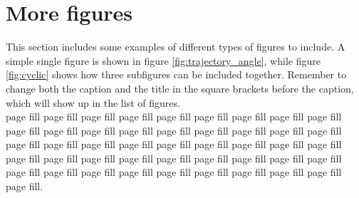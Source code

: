 
\section{More figures}

This section includes some examples of different types of figures to include. A simple single figure is shown in figure \ref{fig:trajectory_angle}, while figure \ref{fig:cyclic} shows how three subfigures can be included together. Remember to change both the caption and the title in the square brackets before the caption, which will show up in the list of figures. \\

\noindent page fill page fill page fill page fill page fill page fill page fill page fill page fill page fill page fill page fill page fill page fill page fill page fill page fill page fill page fill page fill page fill page fill page fill page fill page fill page fill page fill page fill page fill page fill page fill page fill page fill page fill page fill page fill page fill page fill page fill page fill page fill page fill page fill page fill page fill page fill.